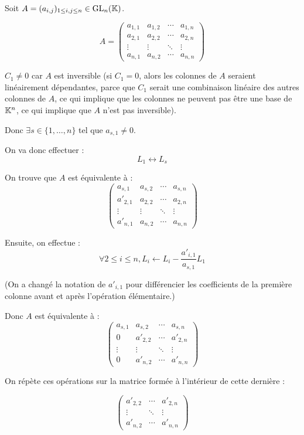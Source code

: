 \documentclass[12pt, a4paper]{report}
\begin{document}
Soit $A = (a_{i,j})_{1 \leq i,j \leq n} \in \mathrm{GL}_n(\mathbb{K})$.

$$A = \left(\begin{matrix}
    a_{1,1} & a_{1,2} & \cdots & a_{1,n} \\
    a_{2,1} & a_{2,2} & \cdots & a_{2,n} \\
    \vdots & \vdots & \ddots & \vdots \\
    a_{n,1} & a_{n,2} & \cdots & a_{n,n}
\end{matrix}\right)$$

$C_1 \ne 0$ car $A$ est inversible (si $C_1 = 0$, alors les colonnes de $A$ seraient linéairement dépendantes, parce que $C_1$ serait une combinaison linéaire des autres colonnes de $A$, ce qui implique que les colonnes ne peuvent pas être une base de $\mathbb{K}^n$, ce qui implique que $A$ n'est pas inversible).

Donc $\exists s \in \{1,\dots,n\}$ tel que $a_{s,1} \ne 0$.

On va donc effectuer :
$$L_1 \leftrightarrow L_s$$

On trouve que $A$ est équivalente à :
$$\left(\begin{matrix}
    a_{s,1} & a_{s,2} & \cdots & a_{s,n} \\
    a'_{2,1} & a_{2,2} & \cdots & a_{2,n} \\
    \vdots & \vdots & \ddots & \vdots \\
    a'_{n,1} & a_{n,2} & \cdots & a_{n,n}
\end{matrix}\right)$$

Ensuite, on effectue :
$$\forall 2 \le i \le n, L_i \leftarrow L_i - \frac{a'_{i,1}}{a_{s,1}} L_1$$

(On a changé la notation de $a'_{i,1}$ pour différencier les coefficients de la première colonne avant et après l'opération élémentaire.)

Donc $A$ est équivalente à :
$$\left(\begin{matrix}
    a_{s,1} & a_{s,2} & \cdots & a_{s,n} \\
    0 & a'_{2,2} & \cdots & a'_{2,n} \\
    \vdots & \vdots & \ddots & \vdots \\
    0 & a'_{n,2} & \cdots & a'_{n,n}
\end{matrix}\right)$$

On répète ces opérations sur la matrice formée à l'intérieur de cette dernière :

$$\left(\begin{matrix}
    a'_{2,2} & \cdots & a'_{2,n} \\
    \vdots & \ddots & \vdots \\
    a'_{n,2} & \cdots & a'_{n,n}
\end{matrix}\right)$$
\end{document}
